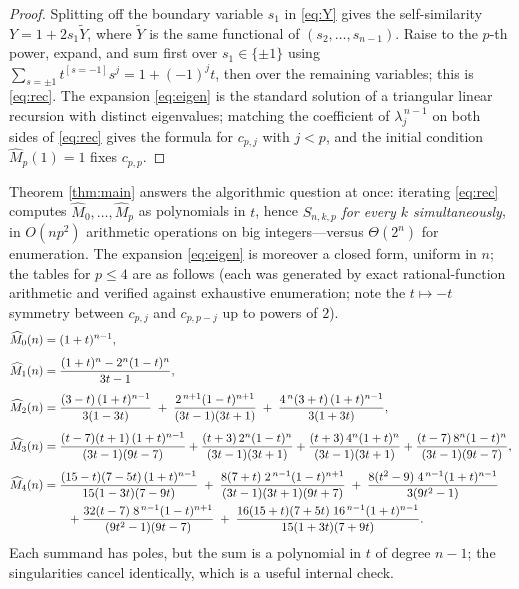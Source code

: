 \documentclass[11pt]{article}
\theoremstyle{remark}
\newcommand{\hM}{\widehat{M}}
\begin{document}
\begin{proof}
Splitting off the boundary variable $s_1$ in \eqref{eq:Y} gives the self-similarity
$Y = 1 + 2 s_1 \widetilde{Y}$, where $\widetilde{Y}$ is the same functional of
$(s_2, \dots, s_{n-1})$. Raise to the $p$-th power, expand, and sum first over
$s_1 \in \{\pm 1\}$ using $\sum_{s = \pm 1} t^{[s = -1]} s^j = 1 + (-1)^j t$, then over the
remaining variables; this is \eqref{eq:rec}. The expansion \eqref{eq:eigen} is the standard
solution of a triangular linear recursion with distinct eigenvalues; matching the coefficient of
$\lambda_j^{\,n-1}$ on both sides of \eqref{eq:rec} gives the formula for $c_{p,j}$ with $j < p$,
and the initial condition $\hM_p(1) = 1$ fixes $c_{p,p}$.
\end{proof}

Theorem \ref{thm:main} answers the algorithmic question at once: iterating \eqref{eq:rec}
computes $\hM_0, \dots, \hM_p$ as polynomials in $t$, hence $S_{n,k,p}$ \emph{for every $k$
simultaneously}, in $O(n p^2)$ arithmetic operations on big integers---versus $\Theta(2^n)$ for
enumeration. The expansion \eqref{eq:eigen} is moreover a closed form, uniform in $n$; the tables
for $p \le 4$ are as follows (each was generated by exact rational-function arithmetic and
verified against exhaustive enumeration; note the $t \mapsto -t$ symmetry between $c_{p,j}$ and
$c_{p,p-j}$ up to powers of $2$).
\begingroup
\allowdisplaybreaks
\begin{align}
\hM_0(n) &= (1+t)^{n-1},\\[4pt]
\hM_1(n) &= \frac{(1+t)^n - 2^n (1-t)^n}{3t - 1},\\[4pt]
\hM_2(n) &= \frac{(3-t)\,(1+t)^{n-1}}{3(1 - 3t)}
\;+\; \frac{2^{\,n+1}(1-t)^{n+1}}{(3t-1)(3t+1)}
\;+\; \frac{4^{\,n}(3+t)\,(1+t)^{n-1}}{3(1 + 3t)},\label{eq:M2}\\[4pt]
\hM_3(n) &= \frac{(t-7)(t+1)\,(1+t)^{n-1}}{(3t-1)(9t-7)}
+ \frac{(t+3)\,2^n(1-t)^{n}}{(3t-1)(3t+1)}
+ \frac{(t+3)\,4^{n}(1+t)^{n}}{(3t-1)(3t+1)}
+ \frac{(t-7)\,8^{n}(1-t)^{n}}{(3t-1)(9t-7)},\label{eq:M3}\\[4pt]
\hM_4(n) &= \frac{(15-t)(7-5t)\,(1+t)^{n-1}}{15(1-3t)(7-9t)}
\;+\; \frac{8(7+t)\;2^{\,n-1}(1-t)^{n+1}}{(3t-1)(3t+1)(9t+7)}
\;+\; \frac{8(t^2 - 9)\;4^{\,n-1}(1+t)^{n-1}}{3(9t^2-1)}\notag\\
&\qquad + \frac{32(t-7)\;8^{\,n-1}(1-t)^{n+1}}{(9t^2-1)(9t-7)}
\;+\; \frac{16(15+t)(7+5t)\;16^{\,n-1}(1+t)^{n-1}}{15(1+3t)(7+9t)}.\label{eq:M4}
\end{align}
\endgroup
Each summand has poles, but the sum is a polynomial in $t$ of degree $n - 1$; the singularities
cancel identically, which is a useful internal check.
\end{document}
